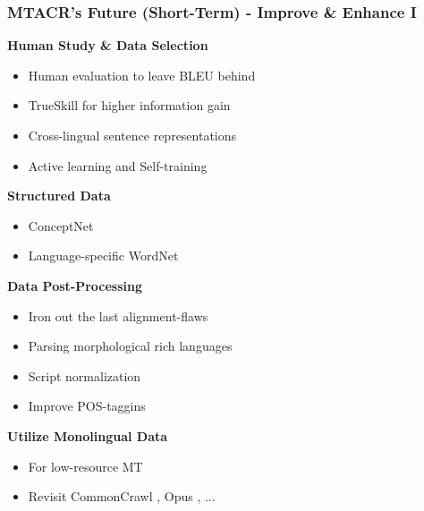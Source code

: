 \documentclass[aspectratio=169]{beamer}
\begin{document}
\begin{frame}[fragile]
	\frametitle{MTACR's Future (Short-Term) - Improve \& Enhance I}
    \begin{minipage}{.50\textwidth}
    \footnotesize
    \textbf{Human Study \& Data Selection}
    \begin{itemize}
        \item Human evaluation to leave BLEU behind
        \item TrueSkill for higher information gain \citep{herbrich2006TrueSkillBayesianSkill, minka2018TrueSkill2Improveda}
        \item Cross-lingual sentence representations \citep{kowtal2024DataSelectionApproach} %
        \item Active learning and Self-training \citep{schroder2024SelfTrainingSampleEfficientActive} %
    \end{itemize}
    \textbf{Structured Data}
    \begin{itemize}
        \item ConceptNet \citep{speer2018ConceptNet55Open}
        \item Language-specific WordNet \citep{aliabadi2014BuildingKurdNetKurdish}
    \end{itemize}
    \end{minipage}%
    \begin{minipage}{.50\textwidth}
    \footnotesize
    \textbf{Data Post-Processing}
    \begin{itemize}
        \item Iron out the last alignment-flaws
        \item Parsing morphological rich languages \citep{tsarfaty2013ParsingMorphologicallyRich} %
        \item Script normalization \citep{ahmadi2023ScriptNormalizationUnconventional, ahmadi2023PALILanguageIdentification}
        \item Improve POS-taggins \citep{morad2024PartofSpeechTaggingNorthern}
    \end{itemize}
    \textbf{Utilize Monolingual Data}
    \begin{itemize}
        \item For low-resource MT \citep{karakanta2018NeuralMachineTranslation} %
        \item Revisit CommonCrawl \citep{kargaran2024GlotCCOpenBroadCoverage}, Opus \citep{tiedemann2012ParallelDataTools}, ... 
    \end{itemize}
    \end{minipage}
\end{frame}
\end{document}
